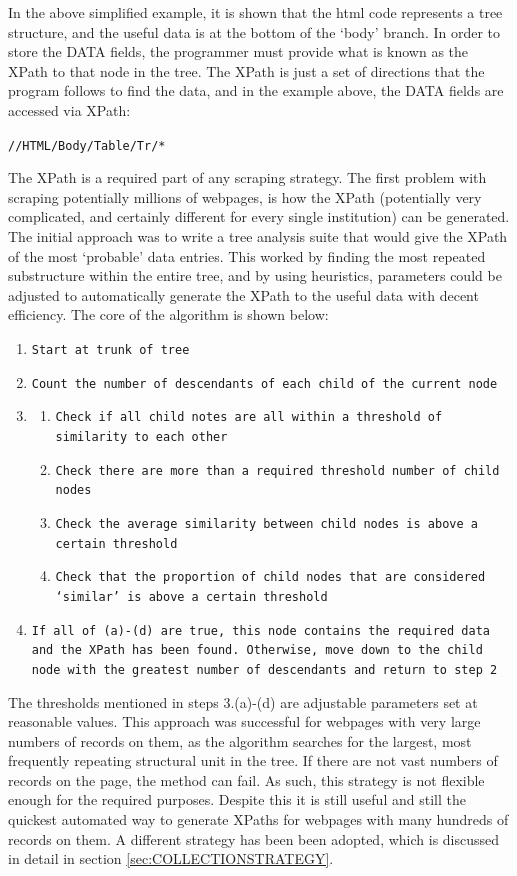 \documentclass[11pt, oneside]{article}   	%
\begin{document}
In the above simplified example, it is shown that the html code represents a tree structure, and the useful data is at the bottom of the `body' branch. In order to store the DATA fields, the programmer must provide what is known as the XPath to that node in the tree. The XPath is just a set of directions that the program follows to find the data, and in the example above, the DATA fields are accessed via XPath:\begin{center} \texttt{//HTML/Body/Table/Tr/*}\end{center}
The XPath is a required part of any scraping strategy. The first problem with scraping potentially millions of webpages, is how the XPath (potentially very complicated, and certainly different for every single institution) can be generated. The initial approach was to write a tree analysis suite that would give the XPath of the most `probable' data entries. This worked by finding the most repeated substructure within the entire tree, and by using heuristics, parameters could be adjusted to automatically generate the XPath to the useful data with decent efficiency. 
The core of the algorithm is shown below: 
\begin{sloppypar}
\begin{enumerate}
\item \texttt{Start at trunk of tree}
\item \texttt{Count the number of descendants of each child of the current node}
\item 
\begin{enumerate}
\item \texttt{Check if all child notes are all within a threshold of similarity to each other}
\item \texttt{Check there are more than a required threshold number of child nodes}
\item \texttt{Check the average similarity between child nodes is above a certain threshold}
\item \texttt{Check that the proportion of child nodes that are considered `similar' is above a certain threshold}
\end{enumerate}
\item \texttt{If all of (a)-(d) are true, this node contains the required data and the XPath has been found. Otherwise, move down to the child node with the greatest number of descendants and return to step 2}
\end{enumerate}
\end{sloppypar}
The thresholds mentioned in steps 3.(a)-(d) are adjustable parameters set at reasonable values. This approach was successful for webpages with very large numbers of records on them, as the algorithm searches for the largest, most frequently repeating structural unit in the tree. If there are not vast numbers of records on the page, the method can fail.
As such, this strategy is not flexible enough for the required purposes. Despite this it is still useful and still the quickest automated way to generate XPaths for webpages with many hundreds of records on them. A different strategy has been been adopted, which is discussed in detail in section \ref{sec:COLLECTIONSTRATEGY}.
\end{document}
